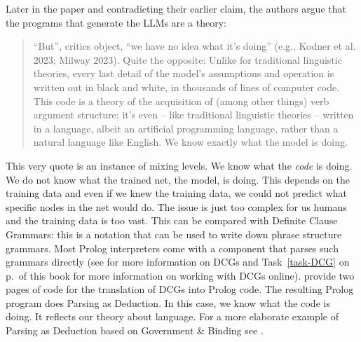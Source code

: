 Later in the paper and contradicting their earlier claim, the authors argue that the programs that generate the LLMs are a theory:
\begin{quote}
``But'', critics object, ``we have no idea what it's doing'' (e.g., Kodner et al. 2023; Milway
2023). Quite the opposite: Unlike for traditional linguistic theories, every last detail of the
model's assumptions and operation is written out in black and white, in thousands of lines of
computer code. This code is a theory of the acquisition of (among other things) verb argument
structure; it's even -- like traditional linguistic theories -- written in a language, albeit an
artificial programming language, rather than a natural language like English. We know exactly what
the model is doing.  \citep[--40]{AmbridgeBlything2024a}
\end{quote}
This very quote is an instance of mixing levels. We know what the \emph{code} is doing. We do not
know what the trained net, the model, is doing. This depends on the training data and even if we
knew the training data, we could not predict what specific nodes in the net would do. The issue is
just too complex for us humans and the training data is too vast. This can be compared with Definite
Clause Grammars: this is a notation that can be used to write down phrase structure grammars. Most
Prolog interpreters come with a component that parses such grammars directly (see
\citealt[Chapter~9]{CM2003a} for more information on DCGs and Task~\ref{task-DCG} on
p.\,\pageref{task-DCG} of this book for more information on working with DCGs online). \citet[268--270]{CM2003a}
provide two pages of code for the translation of DCGs into Prolog code. The resulting Prolog program
does Parsing as Deduction. In this case, we know what the code is doing. It reflects our theory
about language. For a more elaborate example of Parsing as Deduction based on Government \& Binding
see . 


